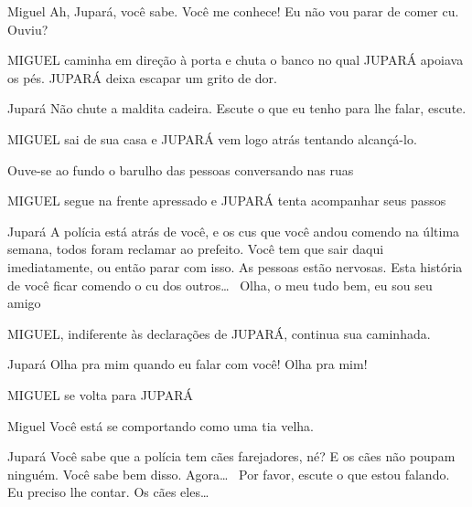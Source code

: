 \documentclass{screenplay}
\begin{document}
\begin{dialogue}[impaciente]{Miguel}
    Ah, Jupará, você sabe. Você me conhece!
    Eu não vou parar de comer cu. Ouviu?
\end{dialogue}

MIGUEL caminha em direção à porta e chuta o banco no qual JUPARÁ apoiava os pés. JUPARÁ deixa escapar um grito de dor.

\begin{dialogue}[levantando-se]{Jupará}
    Não chute a maldita cadeira. Escute o que eu tenho para lhe falar, escute.
\end{dialogue}

MIGUEL sai de sua casa e JUPARÁ vem logo atrás tentando alcançá-lo.


Ouve-se ao fundo o barulho das pessoas conversando nas ruas

MIGUEL segue na frente apressado e JUPARÁ tenta acompanhar seus passos

\begin{dialogue}{Jupará}
    A polícia está atrás de você, e os cus que você andou comendo na última semana, todos foram reclamar ao prefeito.
    Você tem que sair daqui imediatamente, ou então parar com isso. As pessoas estão nervosas.
    Esta história de você ficar comendo o cu dos outros\dots~
    Olha, o meu tudo bem, eu sou seu amigo
\end{dialogue}

MIGUEL, indiferente às declarações de JUPARÁ, continua sua caminhada.

\begin{dialogue}{Jupará}
    Olha pra mim quando eu falar com você! Olha pra mim!
\end{dialogue}

MIGUEL se volta para JUPARÁ

\begin{dialogue}{Miguel}
    Você está se comportando como uma tia velha.
\end{dialogue}

\begin{dialogue}{Jupará}
    Você sabe que a polícia tem cães farejadores, né? E os cães não poupam ninguém. Você sabe bem disso. Agora\dots~
    Por favor, escute o que estou falando. Eu preciso lhe contar. Os cães eles\dots~
\end{dialogue}
\end{document}
